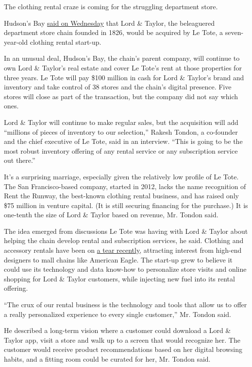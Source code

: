 The clothing rental craze is coming for the struggling department store.

Hudson's Bay
\href{https://www.businesswire.com/news/home/20190828005408/en/}{said on
Wednesday} that Lord \& Taylor, the beleaguered department store chain
founded in 1826, would be acquired by Le Tote, a seven-year-old clothing
rental start-up.

In an unusual deal, Hudson's Bay, the chain's parent company, will
continue to own Lord \& Taylor's real estate and cover Le Tote's rent at
those properties for three years. Le Tote will pay \$100 million in cash
for Lord \& Taylor's brand and inventory and take control of 38 stores
and the chain's digital presence. Five stores will close as part of the
transaction, but the company did not say which ones.

Lord \& Taylor will continue to make regular sales, but the acquisition
will add ``millions of pieces of inventory to our selection,'' Rakesh
Tondon, a co-founder and the chief executive of Le Tote, said in an
interview. ``This is going to be the most robust inventory offering of
any rental service or any subscription service out there.''

It's a surprising marriage, especially given the relatively low profile
of Le Tote. The San Francisco-based company, started in 2012, lacks the
name recognition of Rent the Runway, the best-known clothing rental
business, and has raised only \$75 million in venture capital. (It is
still securing financing for the purchase.) It is one-tenth the size of
Lord \& Taylor based on revenue, Mr. Tondon said.

The idea emerged from discussions Le Tote was having with Lord \& Taylor
about helping the chain develop rental and subscription services, he
said. Clothing and accessory rentals have been on
\href{https://www.nytimes3xbfgragh.onion/2019/06/08/style/rent-subscription-clothing-furniture.html}{a
tear recently}, attracting interest from high-end designers to mall
chains like American Eagle. The start-up grew to believe it could use
its technology and data know-how to personalize store visits and online
shopping for Lord \& Taylor customers, while injecting new fuel into its
rental offering.

``The crux of our rental business is the technology and tools that allow
us to offer a really personalized experience to every single customer,''
Mr. Tondon said.

He described a long-term vision where a customer could download a Lord
\& Taylor app, visit a store and walk up to a screen that would
recognize her. The customer would receive product recommendations based
on her digital browsing habits, and a fitting room could be curated for
her, Mr. Tondon said.

